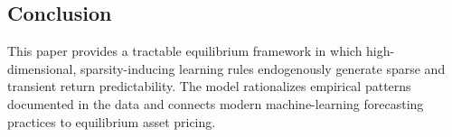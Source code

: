 \documentclass[11pt]{article}
\begin{document}
\subsection*{Conclusion}

This paper provides a tractable equilibrium framework in which high-dimensional, sparsity-inducing learning rules endogenously generate sparse and transient return predictability.
The model rationalizes empirical patterns documented in the data and connects modern machine-learning forecasting practices to equilibrium asset pricing.

\newpage


\end{document}
